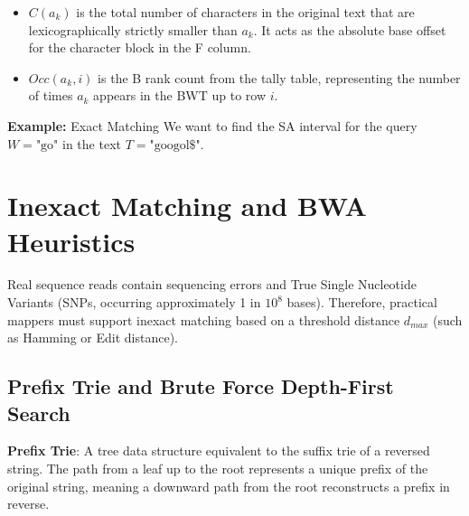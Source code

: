 \begin{itemize}
    \item $C(a_k)$ is the total number of characters in the original text that are lexicographically strictly smaller than $a_k$. It acts as the absolute base offset for the character block in the F column.
    \item $Occ(a_k, i)$ is the B rank count from the tally table, representing the number of times $a_k$ appears in the BWT up to row $i$.
\end{itemize}

\textbf{Example:} Exact Matching
We want to find the SA interval for the query $W = \text{"go"}$ in the text $T = \text{"googol\$"}$.

\section{Inexact Matching and BWA Heuristics}

Real sequence reads contain sequencing errors and True Single Nucleotide Variants (SNPs, occurring approximately 1 in $10^8$ bases). Therefore, practical mappers must support inexact matching based on a threshold distance $d_{max}$ (such as Hamming or Edit distance).

\subsection{Prefix Trie and Brute Force Depth-First Search}

\begin{important}
    \textbf{Prefix Trie}: A tree data structure equivalent to the suffix trie of a reversed string. The path from a leaf up to the root represents a unique prefix of the original string, meaning a downward path from the root reconstructs a prefix in reverse.
\end{important}


